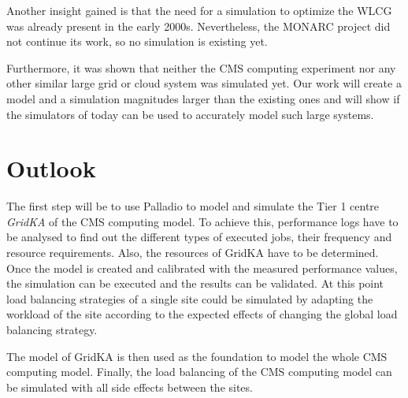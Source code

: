 Another insight gained is that the need for a simulation to optimize the WLCG was already present in the early 2000s. Nevertheless, the MONARC project did not continue its work, so no simulation is existing yet. 

Furthermore, it was shown that neither the CMS computing experiment nor any other similar large grid or cloud system was simulated yet. Our work will create a model and a simulation magnitudes larger than the existing ones and will show if the simulators of today can be used to accurately model such large systems.

\chapter{Outlook}
The first step will be to use Palladio to model and simulate the Tier 1 centre \textit{GridKA} of the CMS computing model. 
To achieve this, performance logs have to be analysed to find out the different types of executed jobs, 
their frequency and resource requirements. Also, the resources of GridKA have to be determined.
Once the model is created and calibrated with the measured performance values, the simulation can be executed and the results can be validated.
At this point load balancing strategies of a single site could be simulated by adapting the workload of the site according to the expected effects of changing the global load balancing strategy.

The model of GridKA is then used as the foundation to model the whole CMS computing model. Finally, the load balancing of the CMS computing model can be simulated with all side effects between the sites.

